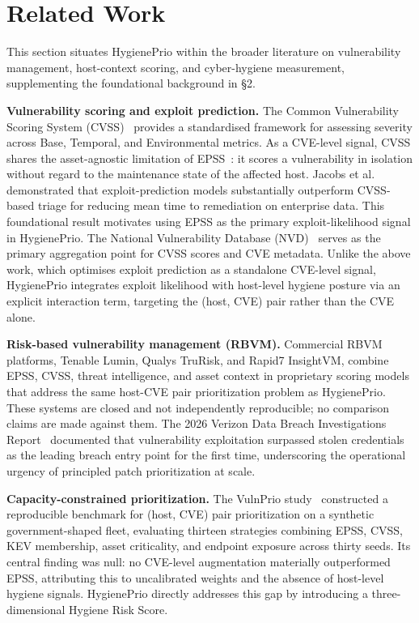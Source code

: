 \section{Related Work}

This section situates HygienePrio within the broader literature on vulnerability management, host-context scoring, and cyber-hygiene measurement, supplementing the foundational background in \S2.

\textbf{Vulnerability scoring and exploit prediction.}
The Common Vulnerability Scoring System (CVSS)~\cite{first2019cvss} provides a standardised framework for assessing severity across Base, Temporal, and Environmental metrics. As a CVE-level signal, CVSS shares the asset-agnostic limitation of EPSS~\cite{jacobs2021epss}: it scores a vulnerability in isolation without regard to the maintenance state of the affected host. Jacobs et al.~\cite{jacobs2020improving} demonstrated that exploit-prediction models substantially outperform CVSS-based triage for reducing mean time to remediation on enterprise data. This foundational result motivates using EPSS as the primary exploit-likelihood signal in HygienePrio. The National Vulnerability Database (NVD)~\cite{nist2026nvd} serves as the primary aggregation point for CVSS scores and CVE metadata. Unlike the above work, which optimises exploit prediction as a standalone CVE-level signal, HygienePrio integrates exploit likelihood with host-level hygiene posture via an explicit interaction term, targeting the (host, CVE) pair rather than the CVE alone.

\textbf{Risk-based vulnerability management (RBVM).}
Commercial RBVM platforms, Tenable Lumin, Qualys TruRisk, and Rapid7 InsightVM, combine EPSS, CVSS, threat intelligence, and asset context in proprietary scoring models that address the same host-CVE pair prioritization problem as HygienePrio. These systems are closed and not independently reproducible; no comparison claims are made against them. The 2026 Verizon Data Breach Investigations Report~\cite{verizon2026dbir} documented that vulnerability exploitation surpassed stolen credentials as the leading breach entry point for the first time, underscoring the operational urgency of principled patch prioritization at scale.

\textbf{Capacity-constrained prioritization.}
The VulnPrio study~\cite{paper1vulnprio} constructed a reproducible benchmark for (host, CVE) pair prioritization on a synthetic government-shaped fleet, evaluating thirteen strategies combining EPSS, CVSS, KEV membership, asset criticality, and endpoint exposure across thirty seeds. Its central finding was null: no CVE-level augmentation materially outperformed EPSS, attributing this to uncalibrated weights and the absence of host-level hygiene signals. HygienePrio directly addresses this gap by introducing a three-dimensional Hygiene Risk Score.

